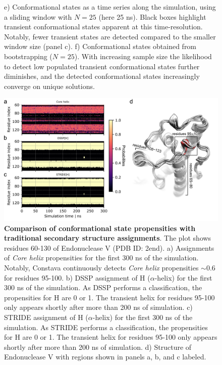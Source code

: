 \begin{figure}[H]
{        e) Conformational states as a time series along the simulation, using a sliding window with $N = 25$ (here 25 ns). Black boxes highlight transient conformational states apparent at this time-resolution. Notably, fewer transient states are detected compared to the smaller window size (panel c).
        f) Conformational states obtained from bootstrapping ($N = 25$). With increasing sample size the likelihood to detect low populated transient conformational states further diminishes, and the detected conformational states increasingly converge on unique solutions.}
    \label{fig:md_timeseries}
\end{figure}








\begin{figure}[ht!]
\includegraphics[width=\textwidth]{constava/figures_constava/figure4.pdf}
\caption{
    \textbf{Comparison of conformational state propensities with traditional secondary structure assignments}. The plot shows residues 60-130 of Endonuclease V (PDB ID: 2end).
    a) Assignments of \textit{Core helix} propensities for the first 300 ns of the simulation. Notably, Constava continuously detects \textit{Core helix} propensities $\sim 0.6$ for residues 95-100. 
    b) DSSP assignment of H ($\alpha$-helix) for the first 300 ns of the simulation. As DSSP performs a classification, the propensities for H are 0 or 1. The transient helix for residues 95-100 only appears shortly after more than 200 ns of simulation.
    c) STRIDE assignment of H ($\alpha$-helix) for the first 300 ns of the simulation. As STRIDE performs a classification, the propensities for H are 0 or 1. The transient helix for residues 95-100 only appears shortly after more than 200 ns of simulation.
    d) Structure of Endonuclease V with regions shown in panels a, b, and c labeled.}
\label{fig:dssp_vs_constava}
\end{figure}


